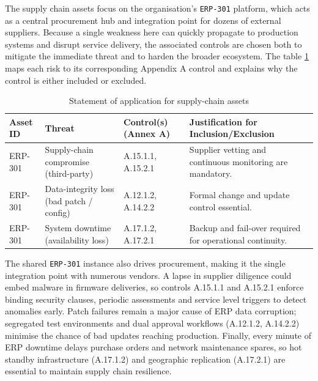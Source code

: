 The supply chain assets focus on the organisation's \texttt{ERP-301} platform, which acts as a central procurement hub and integration point for dozens of external suppliers.
Because a single weakness here can quickly propagate to production systems and disrupt service delivery, the associated controls are chosen both to mitigate the immediate threat and to harden the broader ecosystem.
The table \ref{tab:supply-chain-soa} maps each risk to its corresponding Appendix A control and explains why the control is either included or excluded.

\begin{longtable}{|p{2cm}|p{4cm}|p{4.5cm}|p{4cm}|}
    \caption{Statement of application for supply-chain assets}
    \label{tab:supply-chain-soa}                                                                                                                              \\
    \hline
    \textbf{Asset ID} & \textbf{Threat}                          & \textbf{Control(s)\,(Annex A)} & \textbf{Justification for Inclusion/Exclusion}            \\
    \hline
    \endhead
    ERP-301           & Supply-chain compromise (third-party)    & A.15.1.1, A.15.2.1             & Supplier vetting and continuous monitoring are mandatory. \\
    \hline
    ERP-301           & Data-integrity loss (bad patch / config) & A.12.1.2, A.14.2.2             & Formal change and update control essential.               \\
    \hline
    ERP-301           & System downtime (availability loss)      & A.17.1.2, A.17.2.1             & Backup and fail-over required for operational continuity. \\
    \hline
\end{longtable}

The shared \texttt{ERP-301} instance also drives procurement, making it the single integration point with numerous vendors.
A lapse in supplier diligence could embed malware in firmware deliveries, so controls A.15.1.1 and A.15.2.1 enforce binding security clauses, periodic assessments and service level triggers to detect anomalies early.
Patch failures remain a major cause of \ac{ERP} data corruption; segregated test environments and dual approval workflows (A.12.1.2, A.14.2.2) minimise the chance of bad updates reaching production.
Finally, every minute of \ac{ERP} downtime delays purchase orders and network maintenance spares, so hot standby infrastructure (A.17.1.2) and geographic replication (A.17.2.1) are essential to maintain supply chain resilience.

